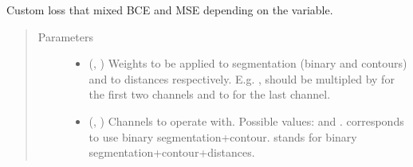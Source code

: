 \documentclass[letterpaper,10pt,english]{sphinxmanual}
\begin{document}
\begin{fulllineitems}
\label{\detokenize{engine/metrics:engine.metrics.instance_segmentation_loss}}
Custom loss that mixed BCE and MSE depending on the  variable.
\begin{quote}\begin{description}
\item[{Parameters}] \leavevmode\begin{itemize}
\item {} 
 (, ) \textendash{} Weights to be applied to segmentation (binary and contours) and to distances respectively. E.g. ,
 should be multipled by  for the first two channels and  to  for the last channel.

\item {} 
 (, ) \textendash{} Channels to operate with. Possible values:  and .  corresponds to use binary
segmentation+contour.  stands for binary segmentation+contour+distances.

\end{itemize}

\end{description}\end{quote}

\end{fulllineitems}

\end{document}
